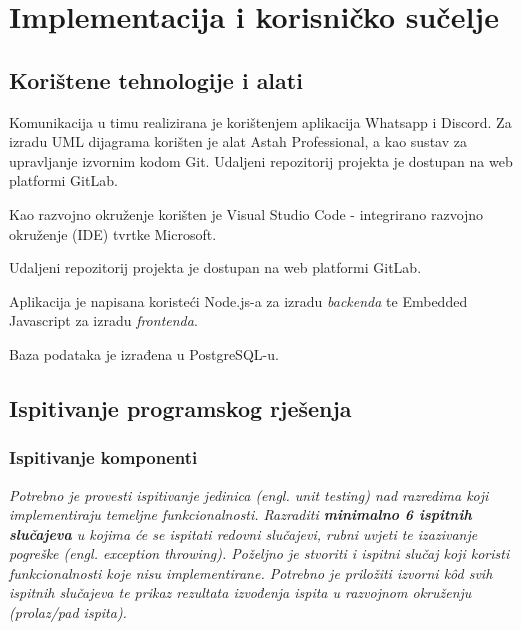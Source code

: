 \chapter{Implementacija i korisničko sučelje}
		
		
		\section{Korištene tehnologije i alati}
			Komunikacija u timu realizirana je korištenjem aplikacija Whatsapp i Discord. Za izradu UML dijagrama korišten je alat Astah Professional, a kao sustav za upravljanje izvornim kodom Git. Udaljeni repozitorij projekta je dostupan na web platformi GitLab.\par
			
			Kao razvojno okruženje korišten je Visual Studio Code - integrirano razvojno okruženje (IDE) tvrtke Microsoft.\par
			
			Udaljeni repozitorij projekta je dostupan na web platformi GitLab.\par
			
			Aplikacija je napisana koristeći Node.js-a za izradu \textit{backenda} te Embedded Javascript za izradu \textit{frontenda}.\par 
			
			Baza podataka je izrađena u PostgreSQL-u.\par
			
			
			\eject 
		
	
		\section{Ispitivanje programskog rješenja}
			
			\subsection{Ispitivanje komponenti}
			\textit{Potrebno je provesti ispitivanje jedinica (engl. unit testing) nad razredima koji implementiraju temeljne funkcionalnosti. Razraditi \textbf{minimalno 6 ispitnih slučajeva} u kojima će se ispitati redovni slučajevi, rubni uvjeti te izazivanje pogreške (engl. exception throwing). Poželjno je stvoriti i ispitni slučaj koji koristi funkcionalnosti koje nisu implementirane. Potrebno je priložiti izvorni kôd svih ispitnih slučajeva te prikaz rezultata izvođenja ispita u razvojnom okruženju (prolaz/pad ispita). }
			
			
			
